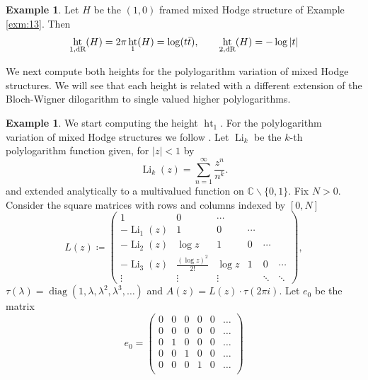 \documentclass[11pt,a4paper]{amsart}
\newcommand{\dR}{\text{\rm dR}}
\newcommand{\C}{\mathds{C}}
\DeclareMathOperator{\Ht}{ht}
\DeclareMathOperator{\Li}{Li}
\DeclareMathOperator{\diag}{diag}
\numberwithin{equation}{section}
\theoremstyle{plain}
\theoremstyle{definition}
\newtheorem{ex}[prop]{Example}
\begin{document}
\begin{ex}
  Let $H$ be the $(1,0)$ framed mixed Hodge structure of Example
  \ref{exm:13}. Then
  \begin{displaymath}
    \Ht_{1,\dR}(H)=2\pi \Ht_{1}(H)=\log(t\bar t), \qquad
    \Ht_{2,\dR}(H)= -\log |t|
  \end{displaymath}
\end{ex}

We next compute both heights for the polylogarithm variation of mixed
Hodge structures. We will see that each height is related with a
different extension of the Bloch-Wigner dilogarithm to single valued
higher polylogarithms.

\begin{ex}\label{exm:2}
  We start computing the height $\Ht_{1}$. For the polylogarithm variation
  of mixed Hodge structures we follow \cite[\S
  1]{beilinsondeligne:_inter_zagier}. Let $\Li_{k}$ be the $k$-th
  polylogarithm function given, for $|z|<1$ by
  \begin{displaymath}
    \Li_{k}(z)=\sum_{n=1}^{\infty}\frac{z^{n}}{n^{k}}.
  \end{displaymath}
  and extended analytically to a multivalued function on
  $\C\smallsetminus \{0,1\}$. Fix $N>0$. Consider the square matrices
  with rows and columns indexed by $[0,N ]$ 
  \begin{displaymath}
    L(z)\coloneqq
    \begin{pmatrix}
      1& 0 & \cdots&&&\\
      -\Li_{1}(z) & 1 & 0& \cdots&&\\
      -\Li_{2}(z)&\log z & 1 & 0 & \cdots &\\
      -\Li_{3}(z)& \frac{(\log z)^{2}}{2!}&\log z & 1 & 0 & \cdots\\
      \vdots & \vdots  & \vdots &&\ddots &\ddots
    \end{pmatrix},
  \end{displaymath}
  $\tau (\lambda )=\diag (1,\lambda ,\lambda ^2,\lambda ^3,\dots)$ and
  $A(z)=L(z)\cdot \tau (2\pi i)$. Let $e_{0}$ be the matrix
  \begin{displaymath}
    e_{0}=
    \begin{pmatrix}
      0& 0 & 0 & 0 & 0 & \dots\\
      0& 0 & 0 & 0 & 0 & \dots\\
      0& 1 & 0 & 0 & 0 & \dots\\
      0& 0 & 1 & 0 & 0 & \dots\\
      0& 0 & 0 & 1 & 0 & \dots\\

\end{pmatrix}
\end{displaymath}
\end{ex}
\end{document}
